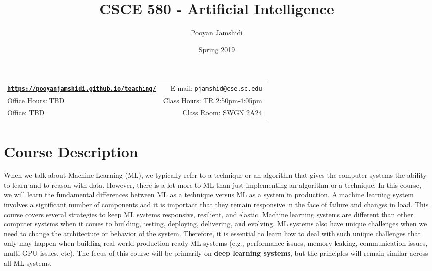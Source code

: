 \documentclass[11pt]{article}
\title{CSCE 580 - Artificial Intelligence}
\author{Pooyan Jamshidi}
\date{Spring 2019}
\newcommand{\blankline}{\quad\pagebreak[2]}
\begin{document}
\maketitle

\blankline

\begin{tabular*}{.93\textwidth}{@{\extracolsep{\fill}}lr}


\href{https://pooyanjamshidi.github.io/teaching/}{\tt\bf https://pooyanjamshidi.github.io/teaching/}  & E-mail: \texttt{pjamshid@cse.sc.edu} \\

 Office Hours: TBD  &  Class Hours: TR 2:50pm-4:05pm \\


 Office: TBD & Class Room: SWGN 2A24 \\
&  \\

\hline
\end{tabular*}

\vspace{10mm}

\section*{Course Description}

When we talk about Machine Learning (ML), we typically refer to a technique or an algorithm that gives the computer systems the ability to learn and to reason with data. However, there is a lot more to ML than just implementing an algorithm or a technique. In this course, we will learn the fundamental differences between ML as a technique versus ML as a system in production. A machine learning system involves a significant number of components and it is important that they remain responsive in the face of failure and changes in load. This course covers several strategies to keep ML systems responsive, resilient, and elastic. Machine learning systems are different than other computer systems when it comes to building, testing, deploying, delivering, and evolving. ML systems also have unique challenges when we need to change the architecture or behavior of the system. Therefore, it is essential to learn how to deal with such unique challenges that only may happen when building real-world production-ready ML systems (e.g., performance issues, memory leaking, communication issues, multi-GPU issues, etc). The focus of this course will be primarily on \textbf{deep learning systems}, but the principles will remain similar across all ML systems. 
\end{document}
